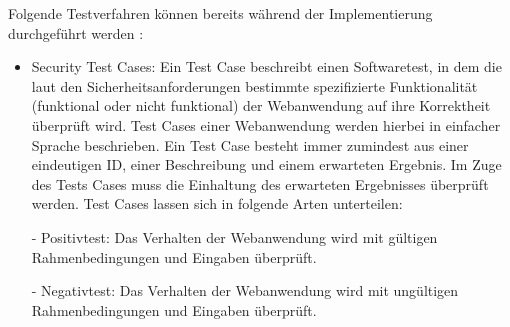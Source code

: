 \documentclass[12pt,oneside,a4paper,parskip,pointlessnumbers]{scrbook}
\begin{document}
  Folgende Testverfahren können bereits während der Implementierung durchgeführt werden \cite{BSI}:
  \begin{itemize}
    \item Security Test Cases:
    Ein Test Case beschreibt einen Softwaretest, in dem die laut den Sicherheitsanforderungen
    bestimmte spezifizierte Funktionalität (funktional oder nicht funktional) der Webanwendung auf
    ihre Korrektheit überprüft wird. Test Cases einer Webanwendung werden hierbei in einfacher
    Sprache beschrieben.
    Ein Test Case besteht immer zumindest aus einer eindeutigen ID, einer Beschreibung und einem
    erwarteten Ergebnis.
    Im Zuge des Tests Cases muss die Einhaltung des erwarteten Ergebnisses überprüft werden.
    Test Cases lassen sich in folgende Arten unterteilen:

    - Positivtest: Das Verhalten der Webanwendung wird mit gültigen Rahmenbedingungen und
    Eingaben überprüft.

    - Negativtest: Das Verhalten der Webanwendung wird mit ungültigen Rahmenbedingungen
    und Eingaben überprüft.


\end{itemize}
\end{document}
